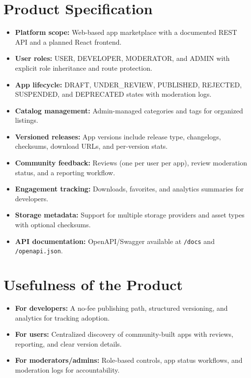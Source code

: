 \documentclass[12pt,a4paper]{article}
\begin{document}
\section{Product Specification}
\begin{itemize}
    \item \textbf{Platform scope:} Web-based app marketplace with a documented REST API and a planned React frontend.
    \item \textbf{User roles:} USER, DEVELOPER, MODERATOR, and ADMIN with explicit role inheritance and route protection.
    \item \textbf{App lifecycle:} DRAFT, UNDER\_REVIEW, PUBLISHED, REJECTED, SUSPENDED, and DEPRECATED states with moderation logs.
    \item \textbf{Catalog management:} Admin-managed categories and tags for organized listings.
    \item \textbf{Versioned releases:} App versions include release type, changelogs, checksums, download URLs, and per-version stats.
    \item \textbf{Community feedback:} Reviews (one per user per app), review moderation status, and a reporting workflow.
    \item \textbf{Engagement tracking:} Downloads, favorites, and analytics summaries for developers.
    \item \textbf{Storage metadata:} Support for multiple storage providers and asset types with optional checksums.
    \item \textbf{API documentation:} OpenAPI/Swagger available at \texttt{/docs} and \texttt{/openapi.json}.
\end{itemize}

\section{Usefulness of the Product}
\begin{itemize}
    \item \textbf{For developers:} A no-fee publishing path, structured versioning, and analytics for tracking adoption.
    \item \textbf{For users:} Centralized discovery of community-built apps with reviews, reporting, and clear version details.
    \item \textbf{For moderators/admins:} Role-based controls, app status workflows, and moderation logs for accountability.
\end{itemize}
\end{document}
